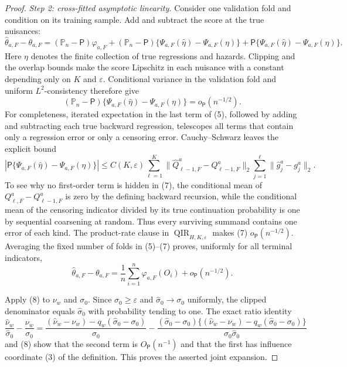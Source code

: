 \documentclass{article}
\begin{document}
\begin{proof}
\emph{Step 2: cross-fitted asymptotic linearity.}
Consider one validation fold and condition on its training sample.  Add and subtract the score at the true nuisances:
\[
 \widehat\theta_{a,F}-\theta_{a,F}
 =(\mathbb P_n-\mathsf P)\varphi_{a,F}
 +(\mathbb P_n-\mathsf P)\{\Psi_{a,F}(\widehat\eta)-\Psi_{a,F}(\eta)\}
 +\mathsf P\{\Psi_{a,F}(\widehat\eta)-\Psi_{a,F}(\eta)\}. \tag{5}
\]
Here \(\eta\) denotes the finite collection of true regressions and hazards.  Clipping and the overlap bounds make the score Lipschitz in each nuisance with a constant depending only on \(K\) and \(\varepsilon\).  Conditional variance in the validation fold and uniform \(L^2\)-consistency therefore give
\[
 (\mathbb P_n-\mathsf P)\{\Psi_{a,F}(\widehat\eta)-\Psi_{a,F}(\eta)\}
 =o_{\mathsf P}(n^{-1/2}).                                \tag{6}
\]
For completeness, iterated expectation in the last term of (5), followed by adding and subtracting each true backward regression, telescopes all terms that contain only a regression error or only a censoring error.  Cauchy--Schwarz leaves the explicit bound
\[
 \left|\mathsf P\{\Psi_{a,F}(\widehat\eta)-\Psi_{a,F}(\eta)\}\right|
 \le C(K,\varepsilon)
 \sum_{\ell=1}^{K}
 \lVert\widehat Q_{\ell-1,F}^a-Q_{\ell-1,F}^a\rVert_2
 \sum_{j=1}^{\ell}\lVert\widehat g_j^a-g_j^a\rVert_2.    \tag{7}
\]
To see why no first-order term is hidden in (7), the conditional mean of
\(Q_{\ell,F}^a-Q_{\ell-1,F}^a\) is zero by the defining backward recursion, while the conditional mean of the censoring indicator divided by its true continuation probability is one by sequential coarsening at random.  Thus every surviving summand contains one error of each kind.  The product-rate clause in \(\operatorname{QIR}_{H,K,\varepsilon}\) makes (7) \(o_{\mathsf P}(n^{-1/2})\).  Averaging the fixed number of folds in (5)--(7) proves, uniformly for all terminal indicators,
\[
 \widehat\theta_{a,F}-\theta_{a,F}
 =\frac1n\sum_{i=1}^n\varphi_{a,F}(O_i)+o_{\mathsf P}(n^{-1/2}). \tag{8}
\]

Apply (8) to \(\nu_w\) and \(\sigma_0\).  Since \(\sigma_0\ge\varepsilon\) and \(\widehat\sigma_0\to\sigma_0\) uniformly, the clipped denominator equals \(\widehat\sigma_0\) with probability tending to one.  The exact ratio identity
\[
 \frac{\widehat\nu_w}{\widehat\sigma_0}-\frac{\nu_w}{\sigma_0}
 =\frac{(\widehat\nu_w-\nu_w)-q_w(\widehat\sigma_0-\sigma_0)}{\sigma_0}
 -\frac{(\widehat\sigma_0-\sigma_0)
 \{(\widehat\nu_w-\nu_w)-q_w(\widehat\sigma_0-\sigma_0)\}}
 {\sigma_0\widehat\sigma_0}                              \tag{9}
\]
and (8) show that the second term is \(O_{\mathsf P}(n^{-1})\) and that the first has influence coordinate (3) of the definition.  This proves the asserted joint expansion.


\end{proof}
\end{document}
